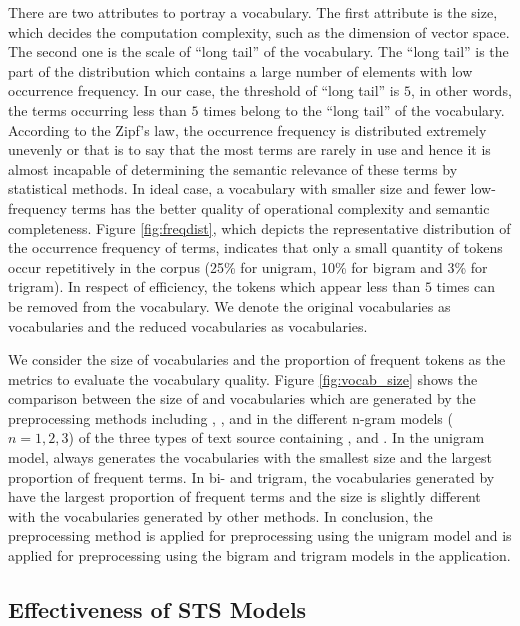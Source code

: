 There are two attributes to portray a vocabulary. The first attribute is the size, which decides the computation complexity, such as the dimension of vector space. The second one is the scale of ``long tail'' of the vocabulary. The ``long tail'' is the part of the distribution which contains a large number of elements with low occurrence frequency. In our case, the threshold of ``long tail'' is $5$, in other words, the terms occurring less than $5$ times belong to the ``long tail'' of the vocabulary. According to the Zipf's law, the occurrence frequency is distributed extremely unevenly or that is to say that the most terms are rarely in use and hence it is almost incapable of determining the semantic relevance of these terms by statistical methods. In ideal case, a vocabulary with smaller size and fewer low-frequency terms has the better quality of operational complexity and semantic completeness. Figure \ref{fig:freqdist}, which depicts the representative distribution of the occurrence frequency of terms, indicates that only a small quantity of tokens occur repetitively in the corpus (25\% for unigram, 10\% for bigram and 3\% for trigram). In respect of efficiency, the tokens which appear less than $5$ times can be removed from the vocabulary. We denote the original vocabularies as \ifull{} vocabularies and the reduced vocabularies as \icommon{} vocabularies. 



We consider the size of \ifull{} vocabularies and the proportion of frequent tokens as the metrics to evaluate the vocabulary quality. Figure \ref{fig:vocab_size} shows the comparison between the size of \ifull{} and \icommon{} vocabularies which are generated by the preprocessing methods including \iSP{}, \iSE{}, \iST{} and \iSS{} in the different n-gram models ($n=1, 2, 3$) of the three types of text source containing \icontent{}, \ititle{} and \isummary{}. In the unigram model, \iSS{} always generates the vocabularies with the smallest size and the largest proportion of frequent terms. In bi- and trigram, the vocabularies generated by \iSE{} have the largest proportion of frequent terms and the size is slightly different with the vocabularies generated by other methods. In conclusion, the preprocessing method \iSS{} is applied for preprocessing using the unigram model and \iSE{} is applied for preprocessing using the bigram and trigram models in the application. 


\subsection{Effectiveness of STS Models}
\label{sec:5.2}


